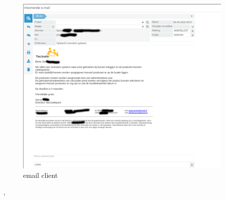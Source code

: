 {{		\begin{figure}
			\begin{center}
				\includegraphics[width=0.95\textwidth]{images/email.png}
			\end{center}
			\caption{email client}
			\label{fig:emailclient}
		\end{figure}
	},
}
